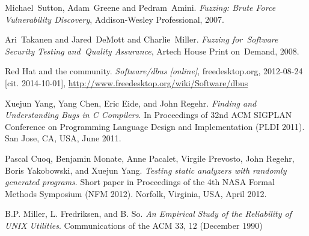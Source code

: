 \documentclass[conference]{IEEEtran}
\begin{document}
%
%
%
\begin{thebibliography}{1}

Michael~Sutton, Adam~Greene and Pedram~Amini. \emph{Fuzzing: Brute Force
Vulnerability Discovery}, Addison-Wesley Professional, 2007.

Ari~Takanen and Jared~DeMott and Charlie~Miller. \emph{Fuzzing for~Software
Security Testing and~Quality Assurance}, Artech House Print on~Demand, 2008.

Red Hat and the community. \emph{Software/dbus [online]}, freedesktop.org,
2012-08-24 [cit. 2014-10-01],
\url{http://www.freedesktop.org/wiki/Software/dbus}

Xuejun Yang, Yang Chen, Eric Eide, and John Regehr. \emph{Finding and
Understanding Bugs in C Compilers}. In Proceedings of 32nd ACM SIGPLAN
Conference on Programming Language Design and Implementation (PLDI 2011). San Jose, CA, USA, June 2011.

Pascal Cuoq, Benjamin Monate, Anne Pacalet, Virgile Prevosto, John Regehr, Boris
Yakobowski, and Xuejun Yang. \emph{Testing static analyzers with randomly
generated programs}. Short paper in Proceedings of the 4th NASA Formal Methods Symposium (NFM 2012). Norfolk, Virginia, USA, April 2012.

B.P. Miller, L. Fredriksen, and B. So. \emph{An Empirical
Study of the Reliability of UNIX Utilities}. Communications of the ACM 33, 12
(December 1990)

\end{thebibliography}
\end{document}
